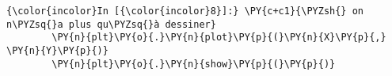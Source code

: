     \begin{Verbatim}[commandchars=\\\{\}]
{\color{incolor}In [{\color{incolor}8}]:} \PY{c+c1}{\PYZsh{} on n\PYZsq{}a plus qu\PYZsq{}à dessiner}
        \PY{n}{plt}\PY{o}{.}\PY{n}{plot}\PY{p}{(}\PY{n}{X}\PY{p}{,} \PY{n}{Y}\PY{p}{)}
        \PY{n}{plt}\PY{o}{.}\PY{n}{show}\PY{p}{(}\PY{p}{)}
\end{Verbatim}


    \begin{center}
    \end{center}
    { \hspace*{\fill} \\}
    

    
    
    
